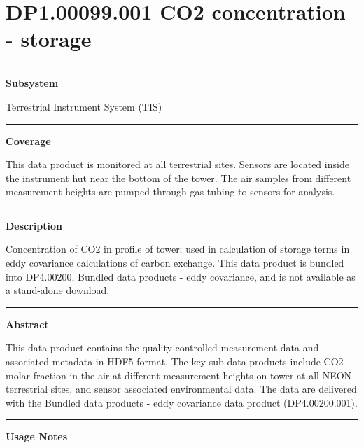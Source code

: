 \documentclass[]{article}
\begin{document}
\section{DP1.00099.001 CO2 concentration -
storage}\label{dp1.00099.001-co2-concentration---storage}

\begin{center}\rule{0.5\linewidth}{\linethickness}\end{center}

\textbf{Subsystem}

Terrestrial Instrument System (TIS)

\begin{center}\rule{0.5\linewidth}{\linethickness}\end{center}

\textbf{Coverage}

This data product is monitored at all terrestrial sites. Sensors are
located inside the instrument hut near the bottom of the tower. The air
samples from different measurement heights are pumped through gas tubing
to sensors for analysis.

\begin{center}\rule{0.5\linewidth}{\linethickness}\end{center}

\textbf{Description}

Concentration of CO2 in profile of tower; used in calculation of storage
terms in eddy covariance calculations of carbon exchange. This data
product is bundled into DP4.00200, Bundled data products - eddy
covariance, and is not available as a stand-alone download.

\begin{center}\rule{0.5\linewidth}{\linethickness}\end{center}

\textbf{Abstract}

This data product contains the quality-controlled measurement data and
associated metadata in HDF5 format. The key sub-data products include
CO2 molar fraction in the air at different measurement heights on tower
at all NEON terrestrial sites, and sensor associated environmental data.
The data are delivered with the Bundled data products - eddy covariance
data product (DP4.00200.001).

\begin{center}\rule{0.5\linewidth}{\linethickness}\end{center}

\textbf{Usage Notes}
\end{document}
